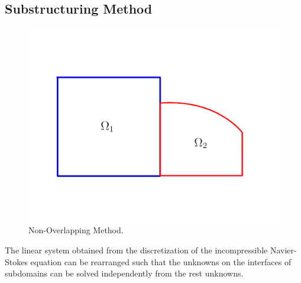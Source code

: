 \normalsize
\subsection*{Substructuring Method}
\begin{figure}[htbp]
  \begin{center}
    \includegraphics[scale=0.3]{../figures/Nonoverlapping.pdf}
    \caption{Non-Overlapping Method.}
    \label{fig:Nonoverlapping}
  \end{center}
\end{figure}

The linear system obtained from the discretization of the incompressible Navier-Stokes equation can be rearranged such that the unknowns on the interfaces of subdomains can be solved independently from the rest unknowns.

